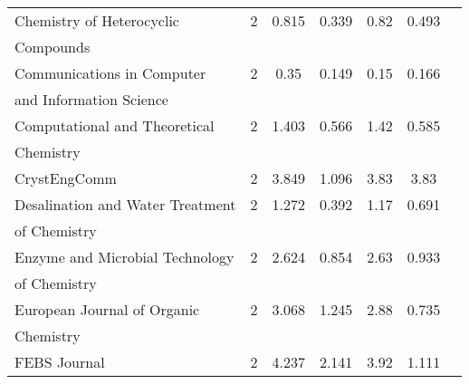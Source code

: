 \begin{longtable}[c]{lcccrcc}
 Chemistry of Heterocyclic                                                          & 2      & 0.815   & 0.339 &  0.82      & 0.493                 \\[0.5ex]
 Compounds                                                                          &        &         &       &            &                       \\[0.5ex]
 Communications in Computer                                                         & 2      & 0.35    & 0.149 &  0.15      & 0.166                 \\[0.5ex]
 and Information Science                                                            &        &         &       &            &                       \\[0.5ex]
 Computational and Theoretical                                                      & 2      & 1.403   & 0.566 &  1.42      & 0.585                 \\[0.5ex]
 Chemistry                                                                          &        &         &       &            &                       \\[0.5ex]
 CrystEngComm                                                                       & 2      & 3.849   & 1.096 &  3.83      & 3.83                  \\[0.5ex]
 Desalination and Water Treatment                                                   & 2      & 1.272   & 0.392 &  1.17      & 0.691                 \\[0.5ex]
 of Chemistry                                                                       &        &         &       &            &                       \\[0.5ex]
 Enzyme and Microbial Technology                                                    & 2      & 2.624   & 0.854 &  2.63      & 0.933                 \\[0.5ex]
 of Chemistry                                                                       &        &         &       &            &                       \\[0.5ex]
 European Journal of Organic                                                        & 2      & 3.068   & 1.245 &  2.88      & 0.735                 \\[0.5ex]
 Chemistry                                                                          &        &         &       &            &                       \\[0.5ex]
 FEBS Journal                                                                       & 2      & 4.237   & 2.141 &  3.92      & 1.111                 \\[0.5ex]

\end{longtable}
